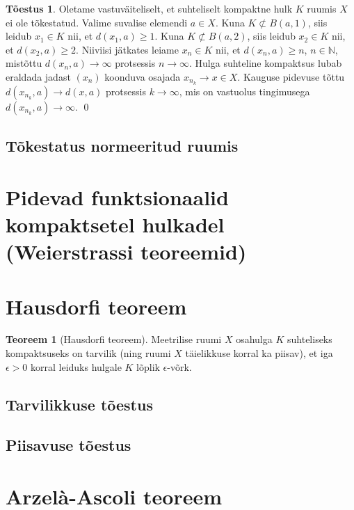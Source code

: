 \documentclass{article}[12pt]
\newcommand{\N}{\mathbb{N}}
\theoremstyle{definition}
\theoremstyle{definition}
\newtheorem{theorem}{Teoreem}[section]
\theoremstyle{definition}
\theoremstyle{break}
\newtheorem*{toestus}{Tõestus}
\begin{document}
\begin{toestus}
	Oletame vastuväiteliselt, et suhteliselt kompaktne hulk $K$ ruumis $X$ ei ole tõkestatud. 
	Valime suvalise elemendi $a\in X$. Kuna $K\not\subset B(a,1)$, siis leidub $x_1\in K$ nii, et $d(x_1,a)\geq 1$. 
	Kuna $K\not\subset B(a,2)$, siis leidub $x_2\in K$ nii, et $d(x_2,a)\geq 2$. 
	Niiviisi jätkates leiame $x_n\in K$ nii, et $d(x_n,a)\geq n$, $n\in\N$, mistõttu $d(x_n,a)\rightarrow \infty$ protsessis $n\rightarrow \infty$. 
	Hulga suhteline kompaktsus lubab eraldada jadast $(x_n)$ koonduva osajada $x_{n_k}\rightarrow x\in X$. 
	Kauguse pidevuse tõttu $d(x_{n_k}, a)\rightarrow d(x,a)$ protsessis $k\rightarrow \infty$, mis on vastuolus tingimusega $d(x_{n_k},a)\rightarrow\infty$.
	\qed
\end{toestus}

\subsection{Tõkestatus normeeritud ruumis}

\section{Pidevad funktsionaalid kompaktsetel hulkadel (Weierstrassi teoreemid)}

\section{Hausdorfi teoreem}


\begin{theorem}[Hausdorfi teoreem]
	Meetrilise ruumi $X$ osahulga $K$ suhteliseks kompaktsuseks on tarvilik (ning ruumi $X$ täielikkuse korral ka piisav), et iga $\epsilon > 0$ korral leiduks hulgale $K$ lõplik $\epsilon$-võrk.
\end{theorem}

\subsection{Tarvilikkuse tõestus}

\subsection{Piisavuse tõestus}

\section{Arzelà-Ascoli teoreem}
\end{document}
